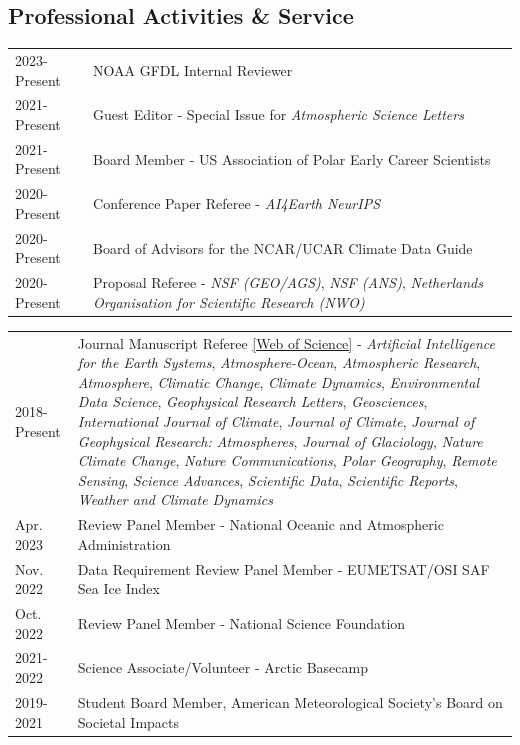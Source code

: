 \documentclass[margin,line,palatino,courier,10pt]{res}
\begin{document}
\begin{resume}
\section{\sc \textcolor{Cerulean}{\large{\textbf{Professional Activities \& Service}}}}
\vspace*{0.05in}
\begin{tabular}{@{}p{0.9in}p{4in}}
2023-Present & NOAA GFDL Internal Reviewer\\
2021-Present & Guest Editor - Special Issue for \textit{Atmospheric Science Letters}\\
2021-Present & Board Member - US Association of Polar Early Career Scientists\\
2020-Present & Conference Paper Referee - \textit{AI4Earth NeurIPS}\\
2020-Present & Board of Advisors for the NCAR/UCAR Climate Data Guide\\
2020-Present & Proposal Referee - \textit{NSF (GEO/AGS)}, \textit{NSF (ANS)}, \textit{Netherlands Organisation for Scientific Research (NWO)}\\
\end{tabular}
\begin{tabular}{@{}p{0.9in}p{4in}}
2018-Present & Journal Manuscript Referee \href{https://www.webofscience.com/wos/author/record/J-4764-2019}{[Web of Science]} - \textit{Artificial Intelligence for the Earth Systems}, \textit{Atmosphere-Ocean}, \textit{Atmospheric Research}, \textit{Atmosphere}, \textit{Climatic Change}, \textit{Climate Dynamics}, \textit{Environmental Data Science}, \textit{Geophysical Research Letters}, \textit{Geosciences}, \textit{International Journal of Climate}, \textit{Journal of Climate}, \textit{Journal of Geophysical Research: Atmospheres}, \textit{Journal of Glaciology}, \textit{Nature Climate Change}, \textit{Nature Communications}, \textit{Polar Geography}, \textit{Remote Sensing}, \textit{Science Advances}, \textit{Scientific Data}, \textit{Scientific Reports}, \textit{Weather and Climate Dynamics} \\
Apr. 2023 & Review Panel Member - National Oceanic and Atmospheric Administration\\
Nov. 2022 & Data Requirement Review Panel Member -  EUMETSAT/OSI SAF Sea Ice Index\\ 
Oct. 2022 & Review Panel Member - National Science Foundation\\
2021-2022 & Science Associate/Volunteer - Arctic Basecamp\\
2019-2021& Student Board Member, American Meteorological Society's Board on Societal Impacts\\

\end{tabular}
\end{resume}
\end{document}
